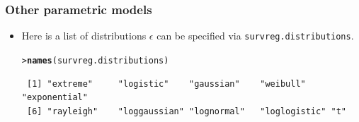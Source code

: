 \documentclass[10pt]{beamer}\usepackage[]{graphicx}\usepackage[]{color}
\makeatletter
\newcommand{\hlstd}[1]{\textcolor[rgb]{0.345,0.345,0.345}{#1}}%
\newcommand{\hlkwd}[1]{\textcolor[rgb]{0.737,0.353,0.396}{\textbf{#1}}}%
\newenvironment{kframe}{%
 \def\at@end@of@kframe{}%
 \ifinner\ifhmode%
  \def\at@end@of@kframe{\end{minipage}}%
  \begin{minipage}{\columnwidth}%
 \fi\fi%
 \def\FrameCommand##1{\hskip\@totalleftmargin \hskip-\fboxsep
 \colorbox{shadecolor}{##1}\hskip-\fboxsep
     \hskip-\linewidth \hskip-\@totalleftmargin \hskip\columnwidth}%
 \MakeFramed {\advance\hsize-\width
   \@totalleftmargin\z@ \linewidth\hsize
   \@setminipage}}%
 {\par\unskip\endMakeFramed%
 \at@end@of@kframe}
\newenvironment{knitrout}{}{} %
\renewenvironment{knitrout}{\setlength{\topsep}{-.2mm}}{}
\newcommand{\code}[1]{{\texttt{#1}}}
\makeatother
\begin{document}
\begin{frame}[fragile]
  \frametitle{Other parametric models}
  \begin{itemize}
  \item Here is a list of distributions $\epsilon$ can be specified via \code{survreg.distributions}.
    \vspace{.1cm}
\begin{knitrout}\scriptsize
{}\color{fgcolor}\begin{kframe}
\begin{alltt}
\hlstd{> }\hlkwd{names}\hlstd{(survreg.distributions)}
\end{alltt}
\begin{verbatim}
 [1] "extreme"     "logistic"    "gaussian"    "weibull"     "exponential"
 [6] "rayleigh"    "loggaussian" "lognormal"   "loglogistic" "t"          
\end{verbatim}
\end{kframe}
\end{knitrout}
  \end{itemize}
\end{frame}
\end{document}
